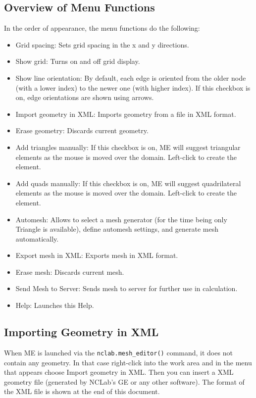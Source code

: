 \documentclass{article}
\begin{document}
\subsection*{Overview of Menu Functions}

In the order of appearance, the menu functions do the following:
\begin{itemize}
\item Grid spacing: Sets grid spacing in the x and y directions.
\item Show grid: Turns on and off grid display.
\item Show line orientation: By default, each edge is oriented from the older 
node (with a lower index) to the newer one (with higher index). If this checkbox 
is on, edge orientations are shown using arrows. 
\item Import geometry in XML: Imports geometry from a file in XML format.
\item Erase geometry: Discards current geometry.
\item Add triangles manually: If this checkbox is on, ME will suggest triangular
      elements as the mouse is moved over the domain. Left-click to create the element.
\item Add quads manually: If this checkbox is on, ME will suggest quadrilateral
      elements as the mouse is moved over the domain. Left-click to create the element.
\item Automesh: Allows to select a mesh generator (for the time being only 
Triangle is available), define automesh settings, and generate mesh automatically. 
\item Export mesh in XML: Exports mesh in XML format.
\item Erase mesh: Discards current mesh.
\item Send Mesh to Server: Sends mesh to server for further use in calculation.
\item Help: Launches this Help.
\end{itemize}

\subsection*{Importing Geometry in XML}

When ME is launched via the {\tt nclab.mesh\_editor()} command, it does not contain any 
geometry. In that case right-click into the work area and in the menu that appears choose 
Import geometry in XML. Then you can insert a XML geometry file (generated by NCLab’s GE 
or any other software). The format of the XML file is shown at the end of this document.
\end{document}
